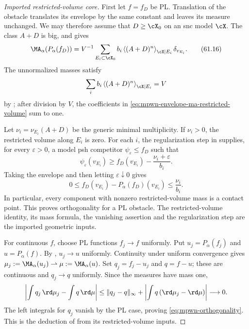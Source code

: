 \begin{proof}[Imported restricted-volume core]
First let $f=f_D$ be PL.  Translation of the obstacle translates
its envelope by the same constant and leaves its measure unchanged.
We may therefore assume that $D\geq\cX_0$ on an snc model $\cX$.
The class $A+D$ is big, and
\cite[Proposition~4.2.2]{MPWN25} gives
\[
 \MA_\alpha(P_\alpha(f_D))
  =V^{-1}\sum_{E_i\subset\cX_0}
       b_i\left\langle(A+D)^n\right\rangle_{\cX\mid E_i}
       \delta_{v_{E_i}}.
\tag{61.16}\label{eq:mpwn-envelope-ma-restricted-volume}
\]
The unnormalized masses satisfy
\[
       \sum_i b_i\left\langle(A+D)^n\right\rangle_{\cX\mid E_i}=V
\]
by \cite[Proposition~4.2.1]{MPWN25}; after division by $V$,
the coefficients in \eqref{eq:mpwn-envelope-ma-restricted-volume}
sum to one.

Let $\nu_i=\nu_{E_i}(A+D)$ be the generic minimal multiplicity.
If $\nu_i>0$, the restricted volume along $E_i$ is zero.
For each $i$, the regularization step in \cite[Proposition~4.2.3]{MPWN25}
supplies, for every $\varepsilon>0$, a model psh competitor
$\psi_\varepsilon\leq f_D$ such that
\[
 \psi_\varepsilon(v_{E_i})
        \geq f_D(v_{E_i})-\frac{\nu_i+\varepsilon}{b_i}.
\]
Taking the envelope and then letting $\varepsilon\downarrow0$
gives
\[
 0\leq f_D(v_{E_i})-P_\alpha(f_D)(v_{E_i})
                                      \leq\frac{\nu_i}{b_i}.
\]
In particular, every component with nonzero restricted-volume
mass is a contact point.  This proves orthogonality for a PL
obstacle.  The restricted-volume identity, its mass formula,
the vanishing assertion and the regularization step are the
imported geometric inputs.

For continuous $f$, choose PL functions $f_j\to f$ uniformly.
Put $u_j=P_\alpha(f_j)$ and $u=P_\alpha(f)$.
By , $u_j\to u$ uniformly.
Continuity under uniform convergence
\cite[Proposition~2.3.2]{MPWN25} gives
$\mu_j:=\MA_\alpha(u_j)\rightharpoonup\mu:=\MA_\alpha(u)$.
Set $q_j=f_j-u_j$ and $q=f-u$; these are continuous and
$q_j\to q$ uniformly.  Since the measures have mass one,
\[
 \left|\int q_j\,\rd\mu_j-\int q\,\rd\mu\right|
 \leq\|q_j-q\|_\infty
                   +\left|\int q\,(\rd\mu_j-\rd\mu)\right|
 \longrightarrow0.
\]
The left integrals for $q_j$ vanish by the PL case, proving
\eqref{eq:mpwn-orthogonality}.
This is the deduction of \cite[Theorem~1.5.1]{MPWN25}
from its restricted-volume inputs.
\end{proof}

